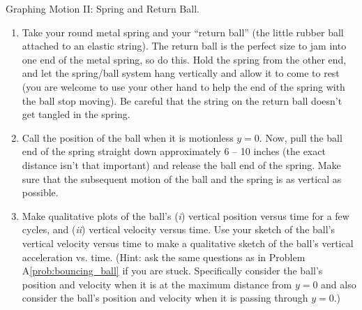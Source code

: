 \begin{aproblem}{Graphing Motion II: Spring and Return Ball.}
  \begin{enumerate}
  \item Take your round metal spring and your ``return ball'' (the
    little rubber ball attached to an elastic string).  The return
    ball is the perfect size to jam into one end of the metal spring,
    so do this.  Hold the spring from the other end, and let the
    spring/ball system hang vertically and allow it to come to rest
    (you are welcome to use your other hand to help the end of the
    spring with the ball stop moving).  Be careful that the string on
    the return ball doesn't get tangled in the spring.
 
  \item Call the position of the ball when it is motionless $y = 0$.
    Now, pull the ball end of the spring straight down approximately 6
    -- 10 inches (the exact distance isn't that important) and release
    the ball end of the spring.  Make sure that the subsequent motion
    of the ball and the spring is as vertical as possible.

  \item Make qualitative plots of the ball's ({\it i}) vertical position
    versus time for a few cycles, and ({\it ii}) vertical velocity versus
    time.  Use your sketch of the ball's vertical velocity versus time
    to make a qualitative sketch of the ball's vertical acceleration
    vs. time.  (Hint: ask the same questions as in Problem
    A\ref{prob:bouncing_ball} if you are stuck.  Specifically consider
    the ball's position and velocity when it is at the maximum
    distance from $y = 0$ and also consider the ball's position and
    velocity when it is passing through $y = 0$.)
  \end{enumerate}
  \label{prob:graphII}
\end{aproblem}


